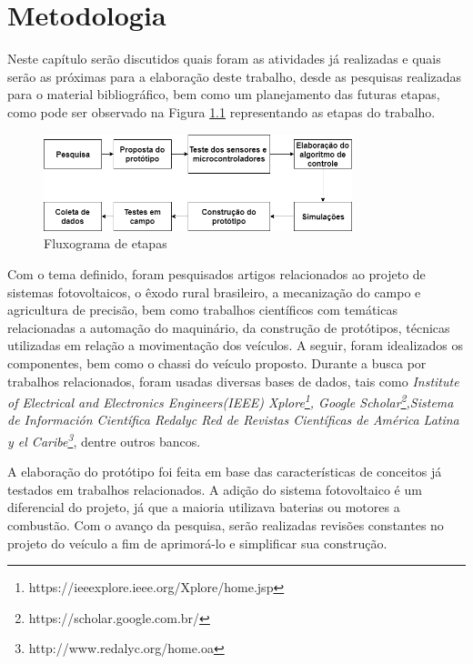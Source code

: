 \chapter{Metodologia}
\label{cap:metodologia}
Neste capítulo serão discutidos quais foram as atividades já realizadas e quais serão as próximas para a elaboração deste trabalho, desde as pesquisas realizadas para o material bibliográfico, bem como um planejamento das futuras etapas, como pode ser observado na Figura \ref{fig:metodologia:etapas} representando as etapas do trabalho. 

\begin{figure}[H]
    \centering
    \includegraphics[width=0.8\textwidth]{figuras/metodologia.png}
    \caption{Fluxograma de etapas}
    \label{fig:metodologia:etapas}
\end{figure}

Com o tema definido, foram pesquisados artigos relacionados ao projeto de sistemas fotovoltaicos, o êxodo rural brasileiro, a mecanização do campo e agricultura de precisão, bem como trabalhos científicos com temáticas relacionadas a automação do  maquinário, da construção de protótipos, técnicas utilizadas em relação a movimentação dos veículos. A seguir, foram idealizados os componentes, bem como o chassi do veículo proposto. Durante a busca por trabalhos relacionados, foram usadas diversas bases de dados, tais como  \textit{Institute of Electrical and Electronics Engineers(IEEE) Xplore\footnote{https://ieeexplore.ieee.org/Xplore/home.jsp}, Google Scholar\footnote{https://scholar.google.com.br/},Sistema de Información Científica Redalyc 
Red de Revistas Científicas de América Latina y el Caribe\footnote{http://www.redalyc.org/home.oa}}, dentre outros bancos. 

A elaboração do protótipo foi feita em base das características de conceitos já testados em trabalhos relacionados. A adição do sistema fotovoltaico é um diferencial do projeto, já que a maioria utilizava baterias ou motores a combustão. Com o avanço da pesquisa, serão realizadas revisões constantes no projeto do veículo a fim de aprimorá-lo e simplificar sua construção.

